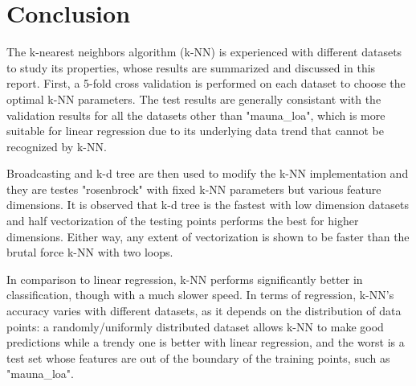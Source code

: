 \documentclass{article} %
\begin{document}
\vspace{0.4cm}
\section*{Conclusion} %
The k-nearest neighbors algorithm (k-NN) is experienced with different datasets to study its properties, whose results are summarized and discussed in this report. First, a 5-fold cross validation is performed on each dataset to choose the optimal k-NN parameters. The test results are generally consistant with the validation results for all the datasets other than "mauna\_loa", which is more suitable for linear regression due to its underlying data trend that cannot be recognized by k-NN.

Broadcasting and k-d tree are then used to modify the k-NN implementation and they are testes "rosenbrock" with fixed k-NN parameters but various feature dimensions. It is observed that k-d tree is the fastest with low dimension datasets and half vectorization of the testing points performs the best for higher dimensions. Either way, any extent of vectorization is shown to be faster than the brutal force k-NN with two loops.

In comparison to linear regression, k-NN performs significantly better in classification, though with a much slower speed. In terms of regression, k-NN's accuracy varies with different datasets, as it depends on the distribution of data points: a randomly/uniformly distributed dataset allows k-NN to make good predictions while a trendy one is better with linear regression, and the worst is a test set whose features are out of the boundary of the training points, such as "mauna\_loa".
\end{document}
